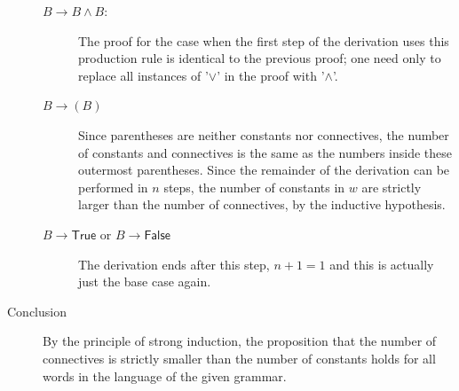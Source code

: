 \documentclass{article}
\begin{document}
\begin{description}
\begin{description}
            \item[$B \to B \land B$:] The proof for the case when the first step of the derivation uses this production rule is identical to the previous proof; one need only to replace all instances of '$\lor$' in the proof with '$\land$'.
            \item[$B\to(B)$] Since parentheses are neither constants nor connectives, the number of constants and connectives is the same as the numbers inside these outermost parentheses. Since the remainder of the derivation can be performed in $n$ steps, the number of constants in $w$ are strictly larger than the number of connectives, by the inductive hypothesis.
            \item[$B \to \mathsf{True}$ or $B \to \mathsf{False}$] The derivation ends after this step, $n+1 = 1$ and this is actually just the base case again.
        \end{description}
        
    \item[Conclusion] By the principle of strong induction, the proposition that the number of connectives is strictly smaller than the number of constants holds for all words in the language of the given grammar.
\end{description}


\newpage
\section{}
\end{document}
